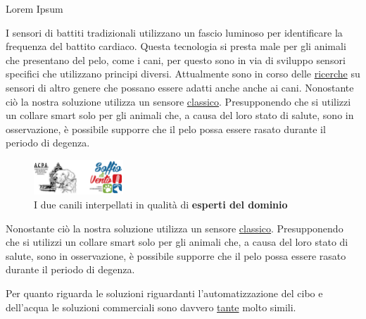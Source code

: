 \begin{tcolorbox}[width=12.1cm]
\begin{frame}{Lorem Ipsum}
    \begin{multicols}{2} %
            I sensori di battiti tradizionali utilizzano un fascio luminoso per identificare la frequenza del battito cardiaco. Questa tecnologia si presta male per gli animali che presentano del pelo, come i cani, per questo sono in via di sviluppo sensori specifici che utilizzano principi diversi. Attualmente sono in corso delle
            \href{https://vcs.vetmed.wsu.edu/research/clinical-studies/clinincal-studies-detail/vcs-clinical-studies/2017/06/28/new-ecg-technology}{ricerche} su sensori di altro genere che possano essere adatti anche anche ai cani.
            Nonostante ciò la nostra soluzione utilizza un sensore
            \href{https://www.amazon.it/Haljia-Sensore-frequenza-cardiaca-Raspberry/dp/B01CBGH4N6}{classico}. Presupponendo che si utilizzi un collare smart solo per gli animali che, a causa del loro stato di salute, sono in osservazione, è possibile supporre che il pelo possa essere rasato durante il periodo di degenza.

        \begin{figure}[H]
            \caption{I due canili interpellati in qualità di \textbf{esperti del dominio}}
            \label{fig:Canili}
            \centering
            \includegraphics[width=0.3\textwidth]{Images/canili.png}
        \end{figure}
    \end{multicols}
\end{frame}
\end{tcolorbox}

Nonostante ciò la nostra soluzione utilizza un sensore
\href{https://www.amazon.it/Haljia-Sensore-frequenza-cardiaca-Raspberry/dp/B01CBGH4N6}{classico}. Presupponendo che si utilizzi un collare smart solo per gli animali che, a causa del loro stato di salute, sono in osservazione, è possibile supporre che il pelo possa essere rasato durante il periodo di degenza.

Per quanto riguarda le soluzioni riguardanti l'automatizzazione del cibo e dell'acqua le soluzioni commerciali sono davvero \href{https://www.fruugo.it/alimentatore-automatico-per-animali-domestici-a-43-l-capacita-alimentatore-intelligente-per-alimentazione-intelligente-per-lalimentazione-del-tempo-e-razionale-con-telecamera-telecomandato-tipo-di-lusso/p-55093501-111996468?language=it&ac=croud}{tante} molto simili.


